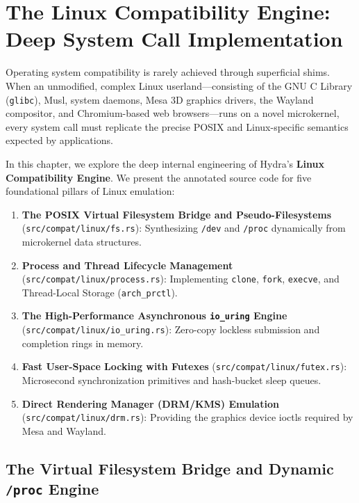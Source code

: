 \chapter{The Linux Compatibility Engine: Deep System Call Implementation}
\label{chap:source_linux_engine}

Operating system compatibility is rarely achieved through superficial shims. When an unmodified, complex Linux userland---consisting of the GNU C Library (\texttt{glibc}), Musl, system daemons, Mesa 3D graphics drivers, the Wayland compositor, and Chromium-based web browsers---runs on a novel microkernel, every system call must replicate the precise POSIX and Linux-specific semantics expected by applications.

In this chapter, we explore the deep internal engineering of Hydra's \textbf{Linux Compatibility Engine}. We present the annotated source code for five foundational pillars of Linux emulation:
\begin{enumerate}
    \item \textbf{The POSIX Virtual Filesystem Bridge and Pseudo-Filesystems} (\texttt{src/compat/linux/fs.rs}): Synthesizing \texttt{/dev} and \texttt{/proc} dynamically from microkernel data structures.
    \item \textbf{Process and Thread Lifecycle Management} (\texttt{src/compat/linux/process.rs}): Implementing \texttt{clone}, \texttt{fork}, \texttt{execve}, and Thread-Local Storage (\texttt{arch\_prctl}).
    \item \textbf{The High-Performance Asynchronous \texttt{io\_uring} Engine} (\texttt{src/compat/linux/io\_uring.rs}): Zero-copy lockless submission and completion rings in memory.
    \item \textbf{Fast User-Space Locking with Futexes} (\texttt{src/compat/linux/futex.rs}): Microsecond synchronization primitives and hash-bucket sleep queues.
    \item \textbf{Direct Rendering Manager (DRM/KMS) Emulation} (\texttt{src/compat/linux/drm.rs}): Providing the graphics device ioctls required by Mesa and Wayland.
\end{enumerate}

\section{The Virtual Filesystem Bridge and Dynamic \texttt{/proc} Engine}
\label{sec:code_linux_fs_annotated}

